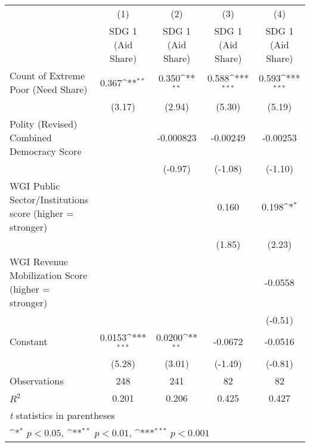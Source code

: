 {
\def\sym#1{\ifmmode^{#1}\else\(^{#1}\)\fi}
\begin{tabular}{l*{4}{c}}
\hline\hline
                &\multicolumn{1}{c}{(1)}&\multicolumn{1}{c}{(2)}&\multicolumn{1}{c}{(3)}&\multicolumn{1}{c}{(4)}\\
                &\multicolumn{1}{c}{SDG 1 (Aid Share)}&\multicolumn{1}{c}{SDG 1 (Aid Share)}&\multicolumn{1}{c}{SDG 1 (Aid Share)}&\multicolumn{1}{c}{SDG 1 (Aid Share)}\\
\hline
Count of Extreme Poor (Need Share)&    0.367\sym{**} &    0.350\sym{**} &    0.588\sym{***}&    0.593\sym{***}\\
                &   (3.17)         &   (2.94)         &   (5.30)         &   (5.19)         \\
[1em]
Polity (Revised) Combined Democracy Score&                  &-0.000823         & -0.00249         & -0.00253         \\
                &                  &  (-0.97)         &  (-1.08)         &  (-1.10)         \\
[1em]
WGI Public Sector/Institutions score (higher = stronger)&                  &                  &    0.160         &    0.198\sym{*}  \\
                &                  &                  &   (1.85)         &   (2.23)         \\
[1em]
WGI Revenue Mobilization Score (higher = stronger)&                  &                  &                  &  -0.0558         \\
                &                  &                  &                  &  (-0.51)         \\
[1em]
Constant        &   0.0153\sym{***}&   0.0200\sym{**} &  -0.0672         &  -0.0516         \\
                &   (5.28)         &   (3.01)         &  (-1.49)         &  (-0.81)         \\
\hline
Observations    &      248         &      241         &       82         &       82         \\
\(R^{2}\)       &    0.201         &    0.206         &    0.425         &    0.427         \\
\hline\hline
\multicolumn{5}{l}{\footnotesize \textit{t} statistics in parentheses}\\
\multicolumn{5}{l}{\footnotesize \sym{*} \(p<0.05\), \sym{**} \(p<0.01\), \sym{***} \(p<0.001\)}\\
\end{tabular}
}

